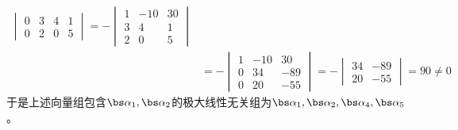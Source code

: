 \documentclass{ctexart}
\begin{document}
\begin{solution}
\begin{enumerate}
\[\begin{aligned}
\begin{vmatrix}
        0&3&4&1\\
        0&2&0&5
    \end{vmatrix}=-\begin{vmatrix}
        1&-10&30\\
        3&4&1\\
        2&0&5
    \end{vmatrix}\\
    &=-\begin{vmatrix}
        1&-10&30\\
        0&34&-89\\
        0&20&-55
    \end{vmatrix}=-\begin{vmatrix}
        34&-89\\20&-55
    \end{vmatrix}=90\neq0
    \end{aligned}\]
    于是上述向量组包含$\bs\alpha_1,\bs\alpha_2$的极大线性无关组为$\bs\alpha_1,\bs\alpha_2,\bs\alpha_4,\bs\alpha_5$。
\end{enumerate}
\end{solution}
\end{document}
